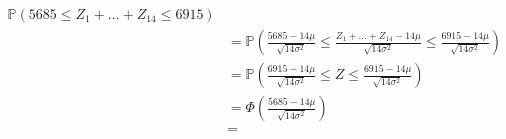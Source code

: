 \begin{eqnarray*}
\mathbb{P}\left(5685 \leq Z_{1} + \ldots + Z_{14} \leq 6915  \right)\\ &= 
\mathbb{P}\left(\frac{5685 - 14\mu}{\sqrt{14\sigma^{2}}} \leq \frac{Z_{1} + \ldots + Z_{14} - 14\mu }{\sqrt{14\sigma^{2}}} \leq \frac{6915 - 14\mu}{\sqrt{14\sigma^{2}}}\right)\\
&=
\mathbb{P}\left(\frac{6915 - 14\mu}{\sqrt{14\sigma^{2}}} \leq Z \leq \frac{6915 - 14\mu}{\sqrt{14\sigma^{2}}}\right)\\
&= \Phi\left(\frac{5685 - 14\mu}{\sqrt{14\sigma^{2}}}\right)\\
&= 
\end{eqnarray*}
